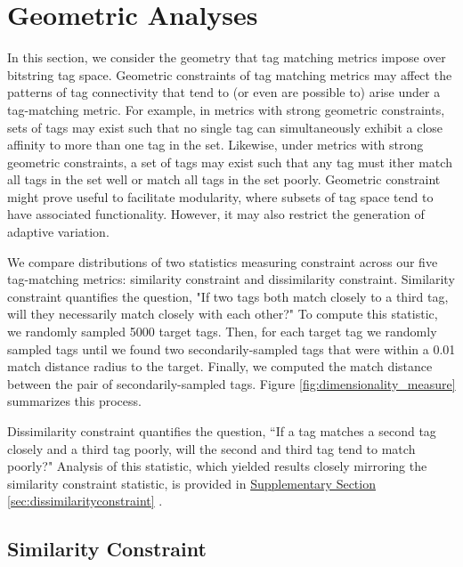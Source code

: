 \section{Geometric Analyses} \label{sec:geometric}

In this section, we consider the geometry that tag matching metrics impose over bitstring tag space.
Geometric constraints of tag matching metrics may affect the patterns of tag connectivity that tend to (or even are possible to) arise under a tag-matching metric. %
For example, in metrics with strong geometric constraints, sets of tags may exist such that no single tag can simultaneously exhibit a close affinity to more than one tag in the set.
Likewise, under metrics with strong geometric constraints, a set of tags may exist such that any tag must ither match all tags in the set well or match all tags in the set poorly.
Geometric constraint might prove useful to facilitate modularity, where subsets of tag space tend to have associated functionality.
However, it may also restrict the generation of adaptive variation.

We compare distributions of two statistics measuring constraint across our five tag-matching metrics: similarity constraint and dissimilarity constraint.
% 
Similarity constraint quantifies the question, "If two tags both match closely to a third tag, will they necessarily match closely with each other?"
To compute this statistic, we randomly sampled 5000 target tags.
Then, for each target tag we randomly sampled tags until we found two secondarily-sampled tags that were within a 0.01 match distance radius to the target.
Finally, we computed the match distance between the pair of secondarily-sampled tags.
Figure \ref{fig:dimensionality_measure} summarizes this process.

Dissimilarity constraint quantifies the question, ``If a tag matches a second tag closely and a third tag poorly, will the second and third tag tend to match poorly?"
Analysis of this statistic, which yielded results closely mirroring the similarity constraint statistic, is provided in \href{doi.org/10.17605/OSF.IO/GW5MC}{Supplementary Section \ref{sec:dissimilarityconstraint}} \cite{Moreno_Ofria_2020}.

\subsection{Similarity Constraint}



